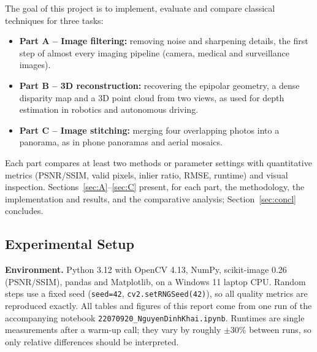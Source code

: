 \documentclass[a4paper,12pt]{article}
\begin{document}
The goal of this project is to implement, evaluate and compare classical techniques for three tasks:
\begin{itemize}[nosep]
    \item \textbf{Part A -- Image filtering:} removing noise and sharpening details, the first step of almost every imaging pipeline (camera, medical and surveillance images).
    \item \textbf{Part B -- 3D reconstruction:} recovering the epipolar geometry, a dense disparity map and a 3D point cloud from two views, as used for depth estimation in robotics and autonomous driving.
    \item \textbf{Part C -- Image stitching:} merging four overlapping photos into a panorama, as in phone panoramas and aerial mosaics.
\end{itemize}
Each part compares at least two methods or parameter settings with quantitative metrics (PSNR/SSIM, valid pixels, inlier ratio, RMSE, runtime) and visual inspection. Sections~\ref{sec:A}--\ref{sec:C} present, for each part, the methodology, the implementation and results, and the comparative analysis; Section~\ref{sec:concl} concludes.

\subsection{Experimental Setup}\label{sec:setup}
\textbf{Environment.} Python 3.12 with OpenCV 4.13, NumPy, scikit-image 0.26 (PSNR/SSIM), pandas and Matplotlib, on a Windows 11 laptop CPU. Random steps use a fixed seed (\texttt{seed=42}, \texttt{cv2.setRNGSeed(42)}), so all quality metrics are reproduced exactly. All tables and figures of this report come from one run of the accompanying notebook \texttt{22070920\_NguyenDinhKhai.ipynb}. Runtimes are single measurements after a warm-up call; they vary by roughly $\pm$30\% between runs, so only relative differences should be interpreted.
\end{document}
